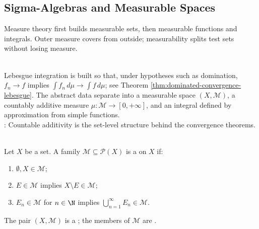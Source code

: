 \subsection{Sigma-Algebras and Measurable Spaces}

%

Measure theory first builds measurable sets, then measurable functions and integrals. Outer measure covers from outside; measurability splits test sets without losing measure.

\begin{perspective} \label{per:measure-integration-roadmap} \\
Lebesgue integration is built so that, under hypotheses such as domination, $f_n\to f$ implies $\int f_n\,d\mu\to\int f\,d\mu$; see Theorem \ref{thm:dominated-convergence-lebesgue}. The abstract data separate into a measurable space $(X,\mathcal{M})$, a countably additive measure $\mu:\mathcal{M}\to[0,+\infty]$, and an integral defined by approximation from simple functions.\\
: Countable additivity is the set-level structure behind the convergence theorems.
\end{perspective}

\begin{definition} \label{def:sigma-algebra-and-measurable-space} \\
Let $X$ be a set. A family $\mathcal{M}\subseteq\mathcal{P}(X)$ is a  on $X$ if:
\begin{enumerate}[label=(\roman*)]
\setlength{\itemsep}{0pt}
\item $\emptyset,X\in\mathcal{M}$;
\item $E\in\mathcal{M}$ implies $X\setminus E\in\mathcal{M}$;
\item $E_n\in\mathcal{M}$ for $n\in\N$ implies $\bigcup\limits_{n=1}^{\infty}E_n\in\mathcal{M}$.
\end{enumerate}
The pair $(X,\mathcal{M})$ is a ; the members of $\mathcal{M}$ are .
\end{definition}

